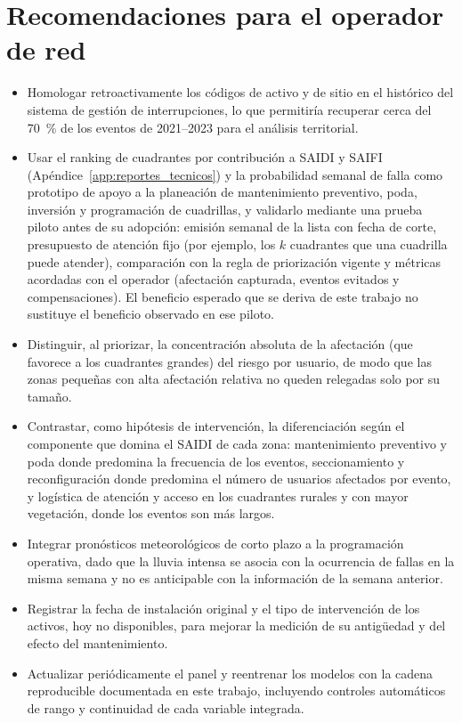 \section{Recomendaciones para el operador de red}

\begin{itemize}
    \item Homologar retroactivamente los códigos de activo y de sitio en el histórico del sistema de gestión de interrupciones, lo que permitiría recuperar cerca del 70~\% de los eventos de 2021--2023 para el análisis territorial.
    \item Usar el ranking de cuadrantes por contribución a SAIDI y SAIFI (Apéndice~\ref{app:reportes_tecnicos}) y la probabilidad semanal de falla como prototipo de apoyo a la planeación de mantenimiento preventivo, poda, inversión y programación de cuadrillas, y validarlo mediante una prueba piloto antes de su adopción: emisión semanal de la lista con fecha de corte, presupuesto de atención fijo (por ejemplo, los $k$ cuadrantes que una cuadrilla puede atender), comparación con la regla de priorización vigente y métricas acordadas con el operador (afectación capturada, eventos evitados y compensaciones). El beneficio esperado que se deriva de este trabajo no sustituye el beneficio observado en ese piloto.
    \item Distinguir, al priorizar, la concentración absoluta de la afectación (que favorece a los cuadrantes grandes) del riesgo por usuario, de modo que las zonas pequeñas con alta afectación relativa no queden relegadas solo por su tamaño.
    \item Contrastar, como hipótesis de intervención, la diferenciación según el componente que domina el SAIDI de cada zona: mantenimiento preventivo y poda donde predomina la frecuencia de los eventos, seccionamiento y reconfiguración donde predomina el número de usuarios afectados por evento, y logística de atención y acceso en los cuadrantes rurales y con mayor vegetación, donde los eventos son más largos.
    \item Integrar pronósticos meteorológicos de corto plazo a la programación operativa, dado que la lluvia intensa se asocia con la ocurrencia de fallas en la misma semana y no es anticipable con la información de la semana anterior.
    \item Registrar la fecha de instalación original y el tipo de intervención de los activos, hoy no disponibles, para mejorar la medición de su antigüedad y del efecto del mantenimiento.
    \item Actualizar periódicamente el panel y reentrenar los modelos con la cadena reproducible documentada en este trabajo, incluyendo controles automáticos de rango y continuidad de cada variable integrada.
\end{itemize}
